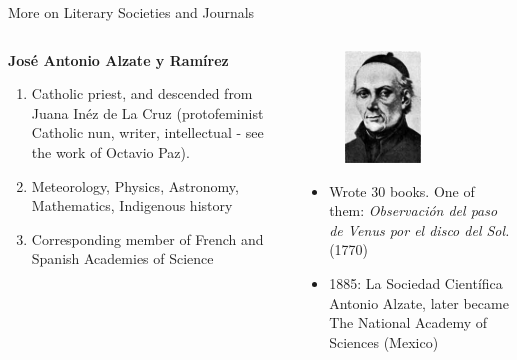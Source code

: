 \documentclass{beamer}
\begin{document}
\begin{frame}[fragile]{More on Literary Societies and Journals}
\small
\begin{columns}
\begin{column}{0.5\textwidth}
\textbf{\alert{Jos\'{e} Antonio Alzate y Ram\'{i}rez}}
\begin{enumerate}
\item Catholic priest, and descended from Juana In\'{e}z de La Cruz (protofeminist Catholic nun, writer, intellectual - see the work of Octavio Paz).
\item Meteorology, Physics, Astronomy, Mathematics, Indigenous history
\item Corresponding member of French and Spanish Academies of Science
\end{enumerate}
\end{column}
\begin{column}{0.5\textwidth}
\begin{figure}
\centering
\includegraphics[width=2cm]{figures/Jose_antonio_alzate_ramirez.jpg}
\end{figure}
\begin{itemize}
\item Wrote 30 books.  One of them: \textit{Observaci\'{o}n del paso de Venus por el disco del Sol.} (1770)
\item 1885: La Sociedad Científica Antonio Alzate, later became The National Academy of Sciences (Mexico)
\end{itemize}
\end{column}
\end{columns}
\end{frame}
\end{document}
